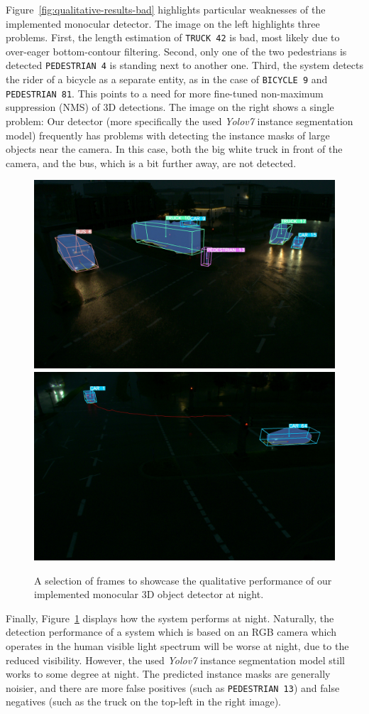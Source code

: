 Figure~\ref{fig:qualitative-results-bad} highlights particular weaknesses of the implemented monocular detector.
The image on the left highlights three problems.
First, the length estimation of \texttt{TRUCK 42} is bad, most likely due to over-eager bottom-contour filtering.
Second, only one of the two pedestrians is detected \textemdash \texttt{PEDESTRIAN 4} is standing next to another one.
Third, the system detects the rider of a bicycle as a separate entity, as in the case of \texttt{BICYCLE 9} and \texttt{PEDESTRIAN 81}.
This points to a need for more fine-tuned non-maximum suppression (NMS) of 3D detections.
The image on the right shows a single problem: Our detector (more specifically the used \textit{Yolov7} instance segmentation model) frequently has problems with detecting the instance masks of large objects near the camera.
In this case, both the big white truck in front of the camera, and the bus, which is a bit further away, are not detected.

\begin{figure}[htb]
    \includegraphics[width=0.499\linewidth]{
        figures/selection/1653330059-588901912-s110-camera-basler-south2-8mm}
    \includegraphics[width=0.499\linewidth]{
        figures/selection/1653330064-207615030-s110-camera-basler-south1-8mm}
    \caption{A selection of frames to showcase the qualitative performance of our implemented monocular 3D object detector at night.}
    \label{fig:qualitative-results-night}
\end{figure}

Finally, Figure~\ref{fig:qualitative-results-night} displays how the system performs at night.
Naturally, the detection performance of a system which is based on an RGB camera which operates in the human visible light spectrum will be worse at night, due to the reduced visibility.
However, the used \textit{Yolov7} instance segmentation model still works to some degree at night.
The predicted instance masks are generally noisier, and there are more false positives (such as \texttt{PEDESTRIAN 13}) and false negatives (such as the truck on the top-left in the right image).

